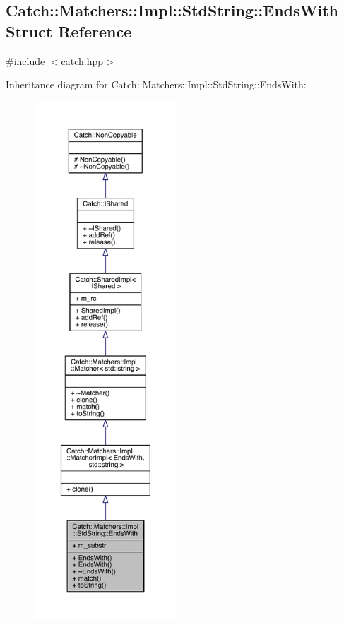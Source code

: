\hypertarget{a00016}{}\subsection{Catch\+:\+:Matchers\+:\+:Impl\+:\+:Std\+String\+:\+:Ends\+With Struct Reference}
\label{a00016}


{\ttfamily \#include $<$catch.\+hpp$>$}



Inheritance diagram for Catch\+:\+:Matchers\+:\+:Impl\+:\+:Std\+String\+:\+:Ends\+With\+:\nopagebreak
\begin{figure}[H]
\begin{center}
\leavevmode
\includegraphics[height=550pt]{a00351}
\end{center}
\end{figure}


